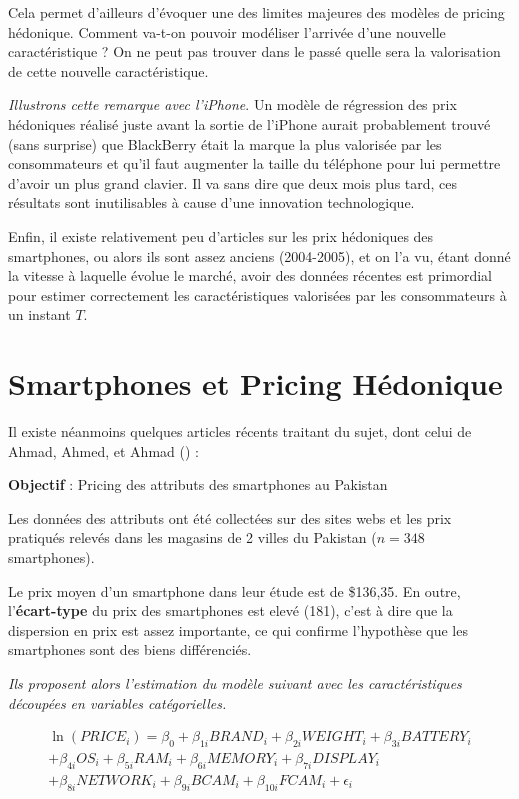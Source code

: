 \documentclass[
  12pt,
]{report}
\begin{document}
\vspace{2em}

Cela permet d'ailleurs d'évoquer une des limites majeures des modèles de
pricing hédonique. Comment va-t-on pouvoir modéliser l'arrivée d'une
nouvelle caractéristique ? On ne peut pas trouver dans le passé quelle
sera la valorisation de cette nouvelle caractéristique.

\emph{Illustrons cette remarque avec l'iPhone}. Un modèle de régression
des prix hédoniques réalisé juste avant la sortie de l'iPhone aurait
probablement trouvé (sans surprise) que BlackBerry était la marque la
plus valorisée par les consommateurs et qu'il faut augmenter la taille
du téléphone pour lui permettre d'avoir un plus grand clavier. Il va
sans dire que deux mois plus tard, ces résultats sont inutilisables à
cause d'une innovation technologique.

Enfin, il existe relativement peu d'articles sur les prix hédoniques des
smartphones, ou alors ils sont assez anciens (2004-2005), et on l'a vu,
étant donné la vitesse à laquelle évolue le marché, avoir des données
récentes est primordial pour estimer correctement les caractéristiques
valorisées par les consommateurs à un instant \(T\).

\newpage

\section{Smartphones et Pricing
Hédonique}\label{smartphones-et-pricing-huxe9donique}

Il existe néanmoins quelques articles récents traitant du sujet, dont
celui de Ahmad, Ahmed, et Ahmad () :

\textbf{Objectif} : Pricing des attributs des smartphones au Pakistan

Les données des attributs ont été collectées sur des sites webs et les
prix pratiqués relevés dans les magasins de 2 villes du Pakistan
(\(n=348\) smartphones).

Le prix moyen d'un smartphone dans leur étude est de \$136,35. En outre,
l'\textbf{écart-type} du prix des smartphones est elevé (181), c'est à
dire que la dispersion en prix est assez importante, ce qui confirme
l'hypothèse que les smartphones sont des biens différenciés.

\emph{Ils proposent alors l'estimation du modèle suivant avec les
caractéristiques découpées en variables catégorielles.}

\[
\begin{split}
\ln(PRICE_i) = \beta_0 + \beta_{1i}BRAND_i + \beta_{2i}WEIGHT_i + \beta_{3i}BATTERY_i \\
+ \beta_{4i}OS_i + \beta_{5i}RAM_i + \beta_{6i}MEMORY_i + \beta_{7i}DISPLAY_i \\
+ \beta_{8i}NETWORK_i + \beta_{9i}BCAM_i + \beta_{10i}FCAM_i + \epsilon_i
\end{split}
\]
\end{document}
